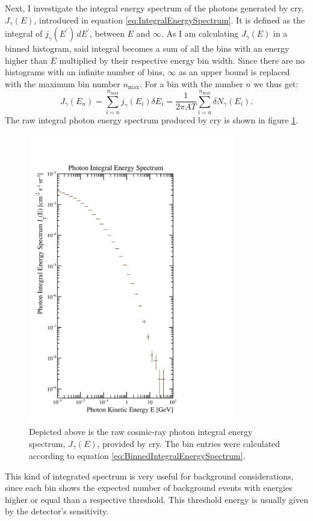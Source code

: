 Next, I investigate the integral energy spectrum of the photons generated by \gls{cry}, $J_\gamma(E)$, introduced in equation \ref{eq:IntegralEnergySpectrum}. It is defined as the integral of $j_\gamma(E^{\prime})\, dE^\prime$, between $E$ and $\infty$. As I am calculating $J_\gamma(E)$ in a binned histogram, said integral becomes a sum of all the bins with an energy higher than $E$ multiplied by their respective energy bin width. Since there are no histograms with an infinite number of bins, $\infty$ as an upper bound is replaced with the maximum bin number $n_\text{max}$. For a bin with the number $n$ we thus get:
\begin{equation} \label{eq:BinnedIntegralEnergySpectrum}
    J_\gamma(E_n) = \sum_{i=n}^{n_\text{max}} j_\gamma(E_i) \delta E_i = \frac{1}{2\pi AT} \sum_{i=n}^{n_\text{max}} \delta N_\gamma(E_i).
\end{equation}
The raw integral photon energy spectrum produced by \gls{cry} is shown in figure \ref{fig:CRYIntegratedEnergy}.
\begin{figure}[htbp]
    \centering
    \includegraphics[width=0.8\textwidth]{images/CosmicGammaBackground/CRYIntegratedEnergy.pdf}
    \caption[Raw Cosmic-Ray Photon Integral Energy Spectrum Provided by CRY]{Depicted above is the raw cosmic-ray photon integral energy spectrum, $J_\gamma(E)$, provided by \gls{cry}. The bin entries were calculated according to equation \ref{eq:BinnedIntegralEnergySpectrum}.}
    \label{fig:CRYIntegratedEnergy}
\end{figure}
This kind of integrated spectrum is very useful for background considerations, since each bin shows the expected number of background events with energies higher or equal than a respective threshold. This threshold energy is usually given by the detector's sensitivity. 

